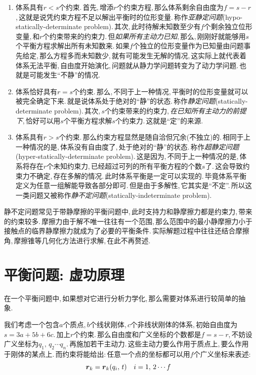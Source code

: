 \begin{enumerate}
	\item 体系具有$r<s$个约束.\,首先,\,增添$r$个约束方程,\,那么体系剩余自由度为$f=s-r$,\,这就是说凭约束方程不足以解出平衡时的位形变量.\,称作\emph{亚静定问题}(hypo-statically-determinate problem).\,其次,\,此时待解未知数至少有$f$个剩余独立位形变量,\,和$r$个约束带来的约束力.\,但\emph{如果所有主动力已知},\,那么,\,刚刚好就能够用$s$个平衡方程求解出所有未知数来.\,如果$f$个独立的位形变量作为已知量由问题事先给定,\,那么方程多而未知数少,\,就有可能发生无解的情况,\,这实际上就代表着体系无法平衡,\,自由度开始演化,\,问题就从静力学问题转变为了动力学问题.\,也就是可能发生``不静''的情况.
	\item 体系恰好具有$r=s$个约束.\,那么,\,不同于上一种情况,\,平衡时的位形变量就可以被完全确定下来.\,就是说体系处于绝对的``静''的状态.\,称作\emph{静定问题}(statically-determinate problem).\,其次,\,$s$个约束带来的约束力,\,\emph{在已知所有主动力的前提下},\,恰好可以用$s$个平衡方程求解$s$个约束力.\,这就是``定''的来源.
	\item 体系具有$r>s$个约束.\,那么约束方程显然是随自洽但冗余(不独立)的.\,相同于上一种情况的是,\,体系没有自由度了,\,处于绝对的``静''的状态.\,称作\emph{超静定问题}(hyper-statically-determinate problem).\,这是因为,\,不同于上一种情况的是,\,体系将存在$r$个未知约束力,\,已经超过可列的所有平衡方程的个数$s$了.\,这会导致约束力不确定,\,存在多解的情况.\,此时体系平衡是一定可以实现的.\,毕竟体系平衡定义为任意一组解能导致各部分即可.\,但是由于多解性,\,它其实是``不定''.\,所以这一类问题又被称作\emph{静不定问题}(statically-indeterminate problem).
\end{enumerate}

静不定问题常见于带静摩擦的平衡问题中,\,此时支持力和静摩擦力都是约束力,\,带来的约束较多.\,摩擦力由于解不唯一往往有一个范围,\,那么范围中的最小静摩擦力小于接触点的临界静摩擦力就成为了必要的平衡条件.\,实际解题过程中往往还结合摩擦角,\,摩擦锥等几何化方法进行求解,\,在此不再赘述.


\section{平衡问题:  虚功原理}

在一个平衡问题中,\,如果想对它进行分析力学化,\,那么需要对体系进行较简单的抽象.

我们考虑一个包含$a$个质点,\,$b$个线状刚体,\,$c$个非线状刚体的体系,\,初始自由度为$s=3a+5b+6c$.\,加上$r$个约束.\,那么自由度和广义坐标的个数都是$f=s-r$,\,不妨设广义坐标为$q_1,\,q_2\cdots q_n$.\,再施加若干主动力.\,这些主动力要么作用于质点上,\,要么作用于刚体的某点上.\,而约束将能给出:\,任意一个点的坐标都可以用$f$个广义坐标来表述:
\[\boldsymbol{r}_k=\boldsymbol{r}_k(q_i,\,t)\quad i=1,\,2\cdots f\]

